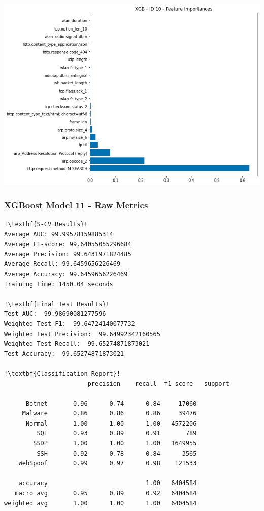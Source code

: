 \begin{appendices}
\begin{lstlisting}[escapechar=!]
\end{lstlisting}
\begin{center}
	\centering
	\includegraphics[width=\textwidth]{Appendices/Images/XGB/Model10/XGB_Model10_FI.png}
\end{center}


\subsubsection{XGBoost Model 11 - Raw Metrics}
\begin{lstlisting}[escapechar=!]
!\textbf{S-CV Results}!
Average AUC: 99.99578159885314
Average F1-score: 99.64055055296684
Average Precision: 99.6431971824485
Average Recall: 99.6459656226469
Average Accuracy: 99.6459656226469
Training Time: 1450.04 seconds

!\textbf{Final Test Results}!
Test AUC:  99.98690081277596
Weighted Test F1:  99.64724140077732
Weighted Test Precision:  99.64992342160565
Weighted Test Recall:  99.65274871873021
Test Accuracy:  99.65274871873021

!\textbf{Classification Report}!
				       precision    recall  f1-score   support

      Botnet       0.96      0.74      0.84     17060
     Malware       0.86      0.86      0.86     39476
      Normal       1.00      1.00      1.00   4572206
         SQL       0.93      0.89      0.91       789
        SSDP       1.00      1.00      1.00   1649955
         SSH       0.92      0.78      0.84      3565
    WebSpoof       0.99      0.97      0.98    121533

    accuracy                           1.00   6404584
   macro avg       0.95      0.89      0.92   6404584
weighted avg       1.00      1.00      1.00   6404584
    

\end{lstlisting}
\end{appendices}
